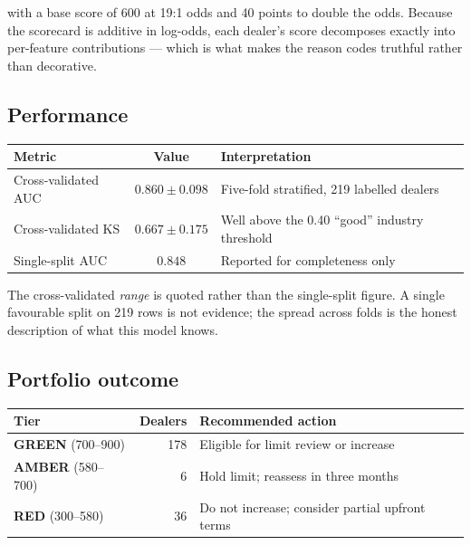 \documentclass[11pt,a4paper]{article}
\begin{document}
with a base score of 600 at 19:1 odds and 40 points to double the odds. Because
the scorecard is additive in log-odds, each dealer's score decomposes exactly
into per-feature contributions --- which is what makes the reason codes
truthful rather than decorative.

\subsection{Performance}

\begin{center}
\small
\begin{tabular}{@{}lcl@{}}
\toprule
\textbf{Metric} & \textbf{Value} & \textbf{Interpretation} \\
\midrule
Cross-validated AUC & $0.860 \pm 0.098$ & Five-fold stratified, 219 labelled dealers \\
Cross-validated KS  & $0.667 \pm 0.175$ & Well above the 0.40 ``good'' industry threshold \\
Single-split AUC    & $0.848$           & Reported for completeness only \\
\bottomrule
\end{tabular}
\end{center}

The cross-validated \emph{range} is quoted rather than the single-split figure.
A single favourable split on 219 rows is not evidence; the spread across folds
is the honest description of what this model knows.

\subsection{Portfolio outcome}

\begin{center}
\small
\begin{tabular}{@{}lrl@{}}
\toprule
\textbf{Tier} & \textbf{Dealers} & \textbf{Recommended action} \\
\midrule
\textcolor{ok}{\textbf{GREEN}} (700--900)  & 178 & Eligible for limit review or increase \\
\textcolor{warn}{\textbf{AMBER}} (580--700) & 6  & Hold limit; reassess in three months \\
\textcolor{bad}{\textbf{RED}} (300--580)   & 36  & Do not increase; consider partial upfront terms \\
\bottomrule
\end{tabular}
\end{center}
\end{document}
